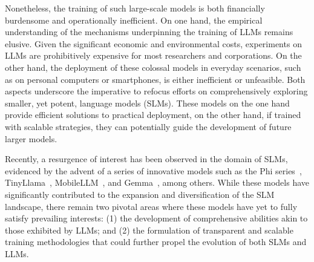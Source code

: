 \documentclass[dvipsnames]{article}
\begin{document}
Nonetheless, the training of such large-scale models is both financially burdensome and operationally inefficient. On one hand, the empirical understanding of the mechanisms underpinning the training of LLMs remains elusive. Given the significant economic and environmental costs, experiments on LLMs are prohibitively expensive for most researchers and corporations. On the other hand, the deployment of these colossal models in everyday scenarios, such as on personal computers or smartphones, is either inefficient or unfeasible. Both aspects underscore the imperative to refocus efforts on comprehensively exploring smaller, yet potent, language models (SLMs). These models on the one hand provide efficient solutions to practical deployment, on the other hand, if trained with scalable strategies, they can potentially guide the development of future larger models.

Recently, a resurgence of interest has been observed in the domain of SLMs, evidenced by the advent of a series of innovative models such as the Phi series~\citep{gunasekar2023textbooks, li2023textbooks, Javaheripi2023Phi2}, TinyLlama~\citep{zhang2024tinyllama}, MobileLLM~\citep{liu2024mobilellm}, and Gemma~\citep{Banks2024Gemma}, among others. While these models have significantly contributed to the expansion and diversification of the SLM landscape, there remain two pivotal areas where these models have yet to fully satisfy prevailing interests: (1) the development of comprehensive abilities akin to those exhibited by LLMs; and (2) the formulation of transparent and scalable training methodologies that could further propel the evolution of both SLMs and LLMs.
\end{document}
